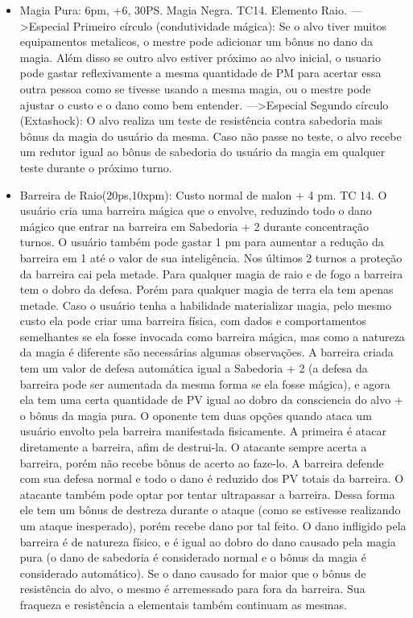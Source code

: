 \begin{itemize}
	\item Magia Pura: 6pm, +6, 30PS. Magia Negra. TC14. Elemento Raio.\newline
--->Especial Primeiro círculo (condutividade mágica): Se o alvo tiver muitos equipamentos metalicos, o mestre pode adicionar um bônus no dano da magia. Além disso se outro alvo estiver próximo ao alvo inicial, o usuario pode gastar reflexivamente a mesma quantidade de PM para acertar essa outra pessoa como se tivesse usando a mesma magia, ou o mestre pode ajustar o custo e o dano como bem entender.\newline
--->Especial Segundo círculo (Extashock): O alvo realiza um teste de resistência contra sabedoria mais bônus da magia do usuário da mesma. Caso não passe no teste, o alvo recebe um redutor igual ao bônus de sabedoria do usuário da magia em qualquer teste durante o próximo turno.


	\item Barreira de Raio(20ps,10xpm): Custo normal de malon + 4 pm. TC 14.\newline
O usuário cria uma barreira mágica que o envolve, reduzindo todo o dano mágico que entrar na barreira em Sabedoria + 2 durante concentração turnos. O usuário também pode gastar 1 pm para aumentar a redução da barreira em 1 até o valor de sua inteligência. Nos últimos 2 turnos a proteção da barreira cai pela metade. Para qualquer magia de raio e de fogo a barreira tem o dobro da defesa. Porém para qualquer magia de terra ela tem apenas metade. Caso o usuário tenha a habilidade materializar magia, pelo mesmo custo ela pode criar uma barreira física, com dados e comportamentos semelhantes se ela fosse invocada como barreira mágica, mas como a natureza da magia é diferente são necessárias algumas observações. A barreira criada tem um valor de defesa automática igual a Sabedoria + 2 (a defesa da barreira pode ser aumentada da mesma forma se ela fosse mágica), e agora ela tem uma certa quantidade de PV igual ao dobro da consciencia do alvo + o bônus da magia pura. O oponente tem duas opções quando ataca um usuário envolto pela barreira manifestada fisicamente. A primeira é atacar diretamente a barreira, afim de destrui-la. O atacante sempre acerta a barreira, porém não recebe bônus de acerto ao faze-lo. A barreira defende com sua defesa normal e todo o dano é reduzido dos PV totais da barreira. O atacante também pode optar por tentar ultrapassar a barreira. Dessa forma ele tem um bônus de destreza durante o ataque (como se estivesse realizando um ataque inesperado), porém recebe dano por tal feito. O dano infligido pela barreira é de natureza físico, e é igual ao dobro do dano causado pela magia pura (o dano de sabedoria é considerado normal e o bônus da magia é considerado automático). Se o dano causado for maior que o bônus de resistência do alvo, o mesmo é arremessado para fora da barreira. Sua fraqueza e resistência a elementais também continuam as mesmas. 


\end{itemize}
